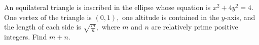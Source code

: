 An equilateral triangle is inscribed in the ellipse whose equation is $x^2+4y^2=4.$  One vertex of the triangle is $(0,1),$ one altitude is contained in the $y$-axis, and the length of each side is $\sqrt{\frac mn},$ where $m$ and $n$ are relatively prime positive integers.  Find $m+n.$